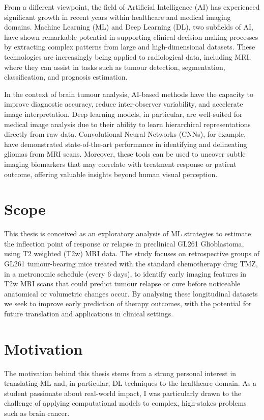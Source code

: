 \documentclass[12pt, a4paper]{report}
\begin{document}
From a different viewpoint, the field of Artificial Intelligence (AI) has experienced significant growth in recent years within healthcare and medical imaging domains. Machine Learning (ML) and Deep Learning (DL), two subfields of AI, have shown remarkable potential in supporting clinical decision-making processes by extracting complex patterns from large and high-dimensional datasets. These technologies are increasingly being applied to radiological data, including MRI, where they can assist in tasks such as tumour detection, segmentation, classification, and prognosis estimation.

In the context of brain tumour analysis, AI-based methods have the capacity to improve diagnostic accuracy, reduce inter-observer variability, and accelerate image interpretation. Deep learning models, in particular, are well-suited for medical image analysis due to their ability to learn hierarchical representations directly from raw data. Convolutional Neural Networks (CNNs), for example, have demonstrated state-of-the-art performance in identifying and delineating gliomas from MRI scans. Moreover, these tools can be used to uncover subtle imaging biomarkers that may correlate with treatment response or patient outcome, offering valuable insights beyond human visual perception.

\section{Scope}
This thesis is conceived as an exploratory analysis of ML strategies to  estimate the inflection point of response or relapse in preclinical GL261 Glioblastoma, using T2 weighted (T2w) MRI data. The study focuses on retrospective groups of GL261 tumour-bearing mice treated with the standard chemotherapy drug TMZ, in a metronomic schedule (every 6 days), to identify early imaging features in T2w MRI scans that could predict tumour relapse or cure before noticeable anatomical or volumetric changes occur. By analysing these longitudinal datasets we seek to improve early prediction of therapy outcomes, with the potential for future translation and applications in clinical settings.

\section{Motivation}

The motivation behind this thesis stems from a strong personal interest in translating ML and, in particular, DL techniques to the healthcare domain. As a student passionate about real-world impact, I was particularly drawn to the challenge of applying computational models to complex, high-stakes problems such as brain cancer.
\end{document}
